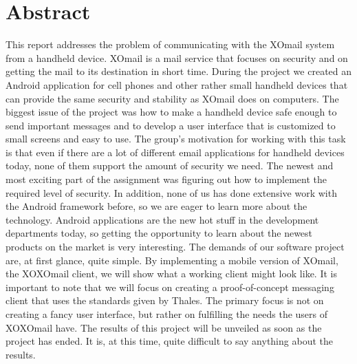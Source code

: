 
\chapter*{Abstract}

This report addresses the problem of communicating with the XOmail system from a handheld device. XOmail is a mail service that focuses on security and on getting the mail to its destination in short time. During the project we created an Android application for cell phones and other rather small handheld devices that can provide the same security and stability as XOmail does on computers. The biggest issue of the project was how to make a handheld device safe enough to send important messages and to develop a user interface that is customized to small screens and easy to use. 
\newline
\newline
The group’s motivation for working with this task is that even if there are a lot of different email applications for handheld devices today, none of them support the amount of security we need. The newest and most exciting part of the assignment was figuring out how to implement the required level of security. In addition, none of us has done extensive work with the Android framework before, so we are eager to learn more about the technology. Android applications are the new hot stuff in the development departments today, so getting the opportunity to learn about the newest products on the market is very interesting. 
\newline
\newline
The demands of our software project are, at first glance, quite simple. By implementing a mobile version of XOmail, the XOXOmail client, we will show what a working client might look like. It is important to note that we will focus on creating a proof-of-concept messaging client that uses the standards given by Thales. The primary focus is not on creating a fancy user interface, but rather on fulfilling the needs the users of XOXOmail have. 
\newline
\newline
The results of this project will be unveiled as soon as the project has ended. It is, at this time, quite difficult to say anything about the results.

